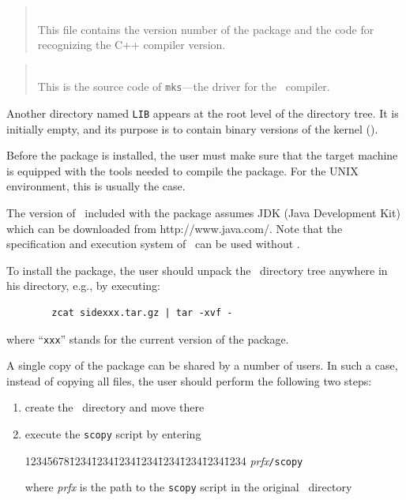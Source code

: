 \begin{quote}
\noindent{}\\ \hspace{0in}
This file contains the version number of the package and the code for
recognizing the C++ compiler version.
\end{quote}

\begin{quote}
\noindent{}\\ \hspace{0in}
This is the source code of {\tt mks}---the driver for the \smurph\ compiler.
\end{quote}\medskip

Another directory named {\tt LIB} appears at the root level of the
directory tree.
It is initially empty, and its purpose is to contain binary versions
of the kernel ().

Before the package is installed, the user must make sure that the target
machine is equipped with the tools needed to compile the package.
For the UNIX environment, this is usually the case.

The version of \dsd\ included with the package assumes JDK (Java Development
Kit) which can be downloaded from
{http://www.java.com/}.
Note that the specification and execution system of \smurph\ can be used
without \dsd.

To install the package, the user should unpack the \smurph\ directory tree
anywhere in his directory, e.g., by executing:
\begin{verbatim}
        zcat sidexxx.tar.gz | tar -xvf -
\end{verbatim}
\noindent
where ``{\tt xxx}'' stands for the current version of the package.

A single copy of the package can be shared by a number of users.
In such a case, instead of copying all files, the user should perform the
following two steps:

\begin{enumerate}
\item
create the \smurphtt\ directory and move there
\item
execute the {\tt scopy} script by entering
{\tt\begin{tabbing}
12345678\=1234\=1234\=1234\=1234\=1234\=1234\=1234\=1234\kill
\> {\em prfx\/}{\tt /scopy}
\end{tabbing}}
where {\em prfx\/} is the path to the {\tt scopy} script in the original
\smurphtt\ directory
\end{enumerate}


